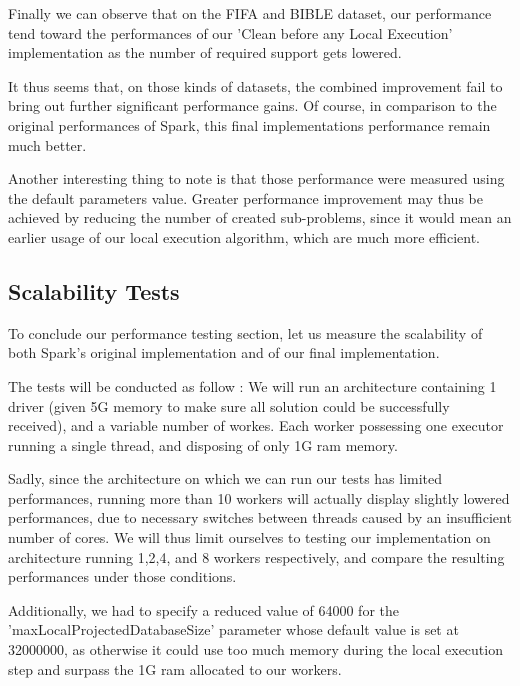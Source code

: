 \documentclass{eplmastersthesis}
\begin{document}
Finally we can observe that on the FIFA and BIBLE dataset, our performance tend toward the performances of our 'Clean before any Local Execution' implementation as the number of required support gets lowered. \newline

It thus seems that, on those kinds of datasets, the combined improvement fail to bring out further significant performance gains.
Of course, in comparison to the original performances of Spark, this final implementations performance remain much better. \newline

Another interesting thing to note is that those performance were measured using the default parameters value. Greater performance improvement may thus be achieved by reducing the number of created sub-problems, since it would mean an earlier usage of our local execution algorithm, which are much more efficient. \newline

\subsection{Scalability Tests}

To conclude our performance testing section, let us measure the scalability of both Spark's original implementation and of our final implementation. \newline

The tests will be conducted as follow : We will run an architecture containing 1 driver (given 5G memory to make sure all solution could be successfully received), and a variable number of workes. Each worker possessing one executor running a single thread, and disposing of only 1G ram memory. \newline

Sadly, since the architecture on which we can run our tests has limited performances, running more than 10 workers will actually display slightly lowered performances, due to necessary switches between threads caused by an insufficient number of cores. We will thus limit ourselves to testing our implementation on architecture running 1,2,4, and 8 workers respectively, and compare the resulting performances under those conditions. \newline

Additionally, we had to specify a reduced value of 64000 for the 'maxLocalProjectedDatabaseSize' parameter whose default value is set at 32000000, as otherwise it could use too much memory during the local execution step and surpass the 1G ram allocated to our workers.
\end{document}
